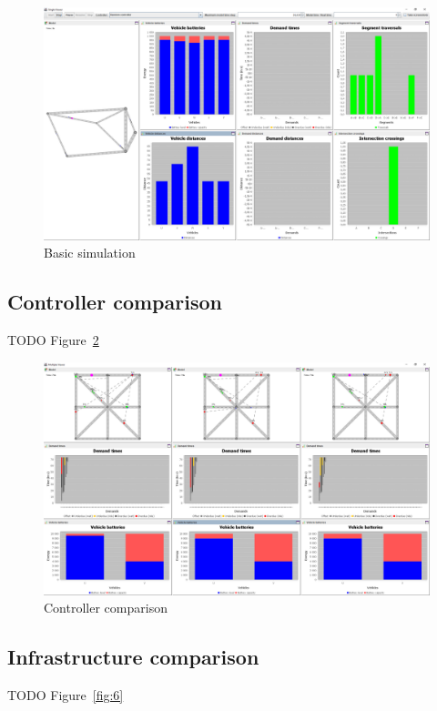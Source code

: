 \documentclass{article}
\begin{document}
    \begin{figure}
        \centering
        \includegraphics[width=\textwidth]{../../screenshots/basic-simulation.png}
        \caption{Basic simulation}
        \label{fig:4}
    \end{figure}

    \subsection{Controller comparison}
    TODO Figure~\ref{fig:5}

    \begin{figure}
        \centering
        \includegraphics[width=\textwidth]{../../screenshots/controller-comparison.png}
        \caption{Controller comparison}
        \label{fig:5}
    \end{figure}

    \subsection{Infrastructure comparison}
    TODO Figure~\ref{fig:6}
\end{document}
